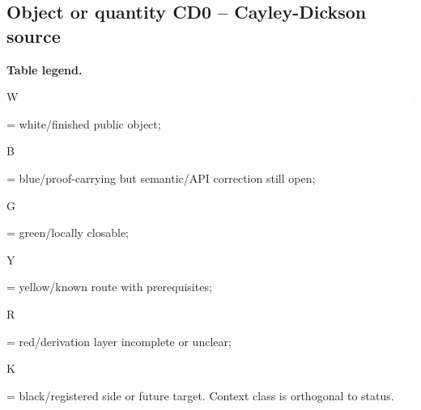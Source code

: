 \subsection*{Object or quantity CD0 -- Cayley-Dickson source}
\hypertarget{objproof:CD0}{}
\par\smallskip\noindent\begin{minipage}{0.99\linewidth}\footnotesize\raggedright\textbf{Table legend.} \colorbox{white}{\strut W} = white/finished public object; \colorbox{cyan!20}{\strut B} = blue/proof-carrying but semantic/API correction still open; \colorbox{green!18}{\strut G} = green/locally closable; \colorbox{yellow!25}{\strut Y} = yellow/known route with prerequisites; \colorbox{red!20}{\strut R} = red/derivation layer incomplete or unclear; \colorbox{black!18}{\strut K} = black/registered side or future target. Context class is orthogonal to status.\end{minipage}\par\vspace{0.25em}
